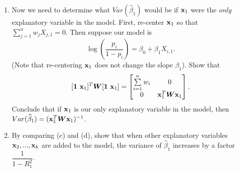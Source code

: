 \documentclass[11pt]{article}
\begin{document}
\begin{enumerate}
\begin{enumerate}
\item Now we need to determine what $Var(\widehat{\beta}_1)$ would be if ${\bf x}_1$ were the \textit{only} explanatory variable in the model. First, re-center ${\bf x}_1$ so that $\sum \limits_{j=1}^n w_j X_{j,1} = 0$. Then suppose our model is
$$\log \left( \dfrac{p_i}{1 - p_i} \right) = \beta_0 + \beta_1 X_{i,1}.$$
(Note that re-centering ${\bf x}_1$ does not change the slope $\beta_1$). Show that
$$[\bm{1} \ {\bf x}_1]^T \bm{W} [\bm{1} \ {\bf x}_1] = \begin{bmatrix}
\sum \limits_{i=1}^n w_i & 0 \\
0 & {\bf x}_1^T \bm{W} {\bf x}_1
\end{bmatrix}.$$
Conclude that if ${\bf x}_1$ is our only explanatory variable in the model, then $Var(\widehat{\beta}_1) = ({\bf x}_1^T \bm{W} {\bf x}_1)^{-1}$.

\item By comparing (c) and (d), show that when other explanatory variables ${\bf x}_2,...,{\bf x}_k$ are added to the model, the variance of $\widehat{\beta}_1$ increases by a factor $\dfrac{1}{1 - R^2_1}$.


\end{enumerate}
\end{enumerate}
\end{document}
